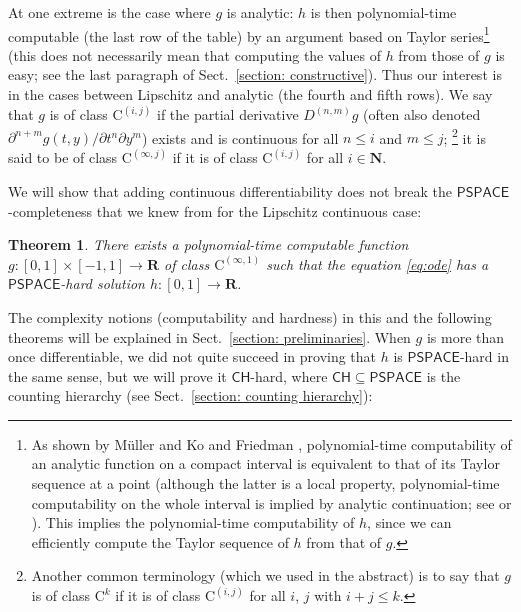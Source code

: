 \documentclass{lmcs}
\newtheorem{theorem}{Theorem}%
\theoremstyle{definition}
\theoremstyle{remark}
\newcommand{\R}{\mathbf R}
\newcommand{\N}{\mathbf N}
\newcommand{\D}{D}
\newcommand{\classPSPACE}{\mathsf{PSPACE}}
\newcommand{\classCH}{\mathsf{CH}}
\newcommand{\classC}{\mathrm C}
\begin{document}
At one extreme is the case where $g$ is analytic: 
$h$ is then polynomial-time computable 
(the last row of the table) 
by an argument based on Taylor series\footnote{
As shown by M\"uller \cite{muller1987uniform} and 
Ko and Friedman \cite{ko1988computing}, 
polynomial-time computability of an analytic function 
on a compact interval is 
equivalent to that of its Taylor sequence at a point 
(although the latter is a local property, 
polynomial-time computability on the whole interval is implied 
by analytic continuation; 
see \cite[Corollary~4.5]{muller1987uniform}
or \cite[Theorem~11]{kawamura2010complexity}). 
This implies the polynomial-time computability of $h$, 
since we can efficiently compute the 
Taylor sequence of $h$ from that of $g$. 
} (this does not necessarily mean that 
computing the values of $h$ from those of $g$ is easy; 
see the last paragraph of Sect.~\ref{section: constructive}). 
Thus our interest is in 
the cases between Lipschitz and analytic 
(the fourth and fifth rows). 
We say that $g$ is of class $\classC ^{(i, j)}$
if the partial derivative $\D ^{(n, m)} g$ 
(often also denoted $\partial ^{n + m} g (t, y) / \partial t ^n \partial y ^m$)
exists and is continuous for all $n \le i$ and $m \le j$;%
\footnote{%
Another common terminology (which we used in the abstract)
is to say that $g$ is of class $\classC ^k$
if it is of class $\classC ^{(i,j)}$ 
for all $i$, $j$ with $i + j \leq k$.}
it is said to be of class $\classC ^{(\infty, j)}$ if
it is of class $\classC ^{(i, j)}$ for all $i \in \N$. 

We will show that adding continuous differentiability does not break the
$\classPSPACE$-completeness that we knew from \cite{kawamura2010lipschitz} 
for the Lipschitz continuous case: 

\begin{theorem}
 \label{DifferentiableIsPspace}
There exists a polynomial-time computable function
$g \colon [0,1] \times [-1,1] \to \R$ 
of class $\classC ^{(\infty, 1)}$ such that
the equation \eqref{eq:ode} has a 
$\classPSPACE$-hard solution $h \colon [0, 1] \to \R$. 
 \end{theorem}

The complexity notions (computability and hardness) in this and the following theorems 
will be explained in Sect.~\ref{section: preliminaries}. 
When $g$ is more than once differentiable, 
we did not quite succeed in proving that $h$ is $\classPSPACE$-hard
in the same sense, 
but we will prove it $\classCH$-hard, 
where $\classCH \subseteq \classPSPACE$ is the 
counting hierarchy (see Sect.~\ref{section: counting hierarchy}): 
\end{document}

